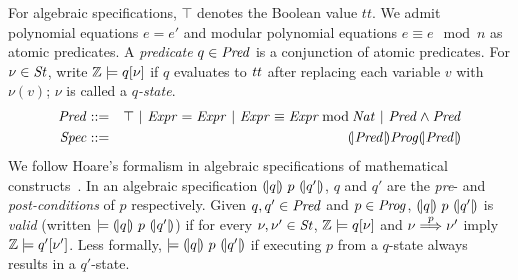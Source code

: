 For algebraic specifications, $\top$ denotes the Boolean value
$\mathit{tt}$. We admit polynomial equations $e = e'$ and modular
polynomial equations $e \equiv e \mod n$ as atomic predicates.
A \emph{predicate} $q \in \mathit{Pred}$ is a conjunction of atomic
predicates. For 
$\nu \in \mathit{St}$, write $\mathbb{Z} \models q[\nu]$ if $q$
evaluates to $\mathit{tt}$ after replacing each variable $v$ with
$\nu(v)$; $\nu$ is called a \emph{$q$-state}.
\begin{eqnarray*}
  \mathit{Pred} & ::= & \top
     \ |\   \mathit{Expr} = \mathit{Expr}
     \ |\   \mathit{Expr} \equiv \mathit{Expr} \mathbin{\textmd{mod}} \mathit{Nat}
     \ |\   \mathit{Pred} \wedge \mathit{Pred}\\
  \mathit{Spec} & ::= & {(\!|}{\mathit{Pred}}{|\!)} \mathit{Prog} {(\!|}{\mathit{Pred}}{|\!)}
\end{eqnarray*}
We follow Hoare's formalism in algebraic specifications of
mathematical constructs~\cite{H:69:ABCP}. In an algebraic
specification ${(\!|}{q}{|\!)}~{p}~{(\!|}{q'}{|\!)}$, $q$ and $q'$ are the \emph{pre}- and
\emph{post-conditions} of $p$ respectively. Given $q, q' \in \mathit{Pred}$ and $p
\in \mathit{Prog}$, ${(\!|}{q}{|\!)}~{p}~{(\!|}{q'}{|\!)}$ is \emph{valid}
(written $\models {(\!|}{q}{|\!)}~{p}~{(\!|}{q'}{|\!)}$) if for every $\nu, \nu' \in
\mathit{St}$, $\mathbb{Z} \models q[\nu]$ and $\nu \overset{p}{\Longrightarrow} \nu'$ imply
$\mathbb{Z} \models q'[\nu']$. Less formally, $\models
{(\!|}{q}{|\!)}~{p}~{(\!|}{q'}{|\!)}$ if executing $p$ from a $q$-state always
results in a $q'$-state. 

